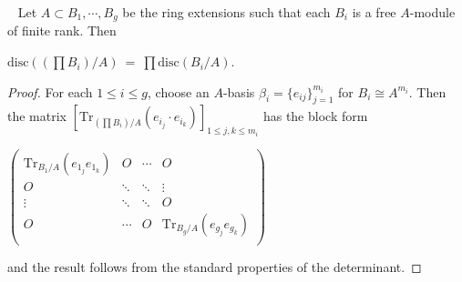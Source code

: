 \documentclass[12pt,a4paper,footinclude=true,headinclude=true]{scrbook} %
\newenvironment{lemma}[2][]
{\renewcommand\theinnercustomlemma{#2}\innercustomlemma[#1]
\begin{mdframed}[backgroundcolor=gray!20]\ }
{\end{mdframed}\endinnercustomprop}
\begin{document}
\begin{lemma}{162}
    Let $A\subset B_1,\cdots,B_g$ be the ring extensions such that each $B_i$ is a free $A$-module of finite rank. Then\\
    \centerline{$\mathrm{disc}((\prod B_i)/A)\ =\ \prod\mathrm{disc} (B_i/A)$.}
\end{lemma}
\begin{proof}
    For each $1\leq i\leq g$, choose an $A$-basis $\beta_i=\{e_{ij}\}_{j=1}^{m_i}$ for $B_i\cong A^{m_i}$. Then the matrix $[\mathrm{Tr}_{(\prod B_i)/A}(e_{i_j}\cdot e_{i_k})]_{1\leq j,k\leq m_i}$ has the block form
    \begin{center}
        $\begin{pmatrix}
        \mathrm{Tr}_{B_1/A}(e_{1_j}e_{1_k}) & O & \cdots & O \\
        O & \ddots & \ddots  & \vdots \\
        \vdots & \ddots & \ddots & O \\
        O & \cdots & O & \mathrm{Tr}_{B_g/A}(e_{g_j}e_{g_k}) \\
        \end{pmatrix}$
    \end{center} 
    and the result follows from the standard properties of the determinant.
\end{proof}
\end{document}
